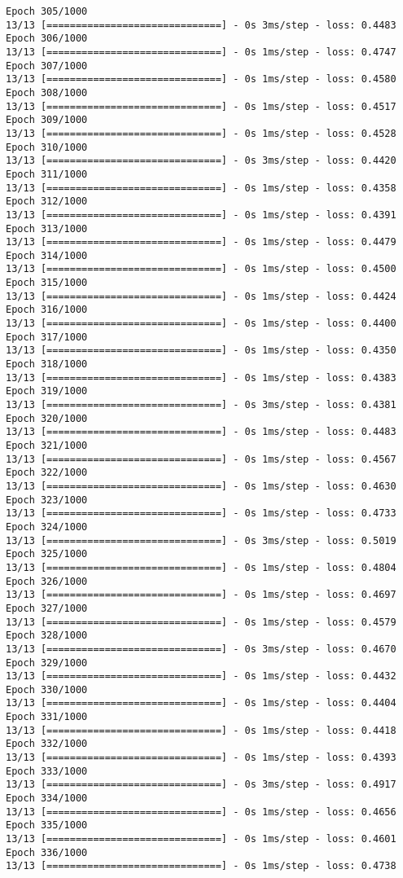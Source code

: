 \documentclass[11pt]{article}
\begin{document}
\begin{Verbatim}[commandchars=\\\{\}]
Epoch 305/1000
13/13 [==============================] - 0s 3ms/step - loss: 0.4483
Epoch 306/1000
13/13 [==============================] - 0s 1ms/step - loss: 0.4747
Epoch 307/1000
13/13 [==============================] - 0s 1ms/step - loss: 0.4580
Epoch 308/1000
13/13 [==============================] - 0s 1ms/step - loss: 0.4517
Epoch 309/1000
13/13 [==============================] - 0s 1ms/step - loss: 0.4528
Epoch 310/1000
13/13 [==============================] - 0s 3ms/step - loss: 0.4420
Epoch 311/1000
13/13 [==============================] - 0s 1ms/step - loss: 0.4358
Epoch 312/1000
13/13 [==============================] - 0s 1ms/step - loss: 0.4391
Epoch 313/1000
13/13 [==============================] - 0s 1ms/step - loss: 0.4479
Epoch 314/1000
13/13 [==============================] - 0s 1ms/step - loss: 0.4500
Epoch 315/1000
13/13 [==============================] - 0s 1ms/step - loss: 0.4424
Epoch 316/1000
13/13 [==============================] - 0s 1ms/step - loss: 0.4400
Epoch 317/1000
13/13 [==============================] - 0s 1ms/step - loss: 0.4350
Epoch 318/1000
13/13 [==============================] - 0s 1ms/step - loss: 0.4383
Epoch 319/1000
13/13 [==============================] - 0s 3ms/step - loss: 0.4381
Epoch 320/1000
13/13 [==============================] - 0s 1ms/step - loss: 0.4483
Epoch 321/1000
13/13 [==============================] - 0s 1ms/step - loss: 0.4567
Epoch 322/1000
13/13 [==============================] - 0s 1ms/step - loss: 0.4630
Epoch 323/1000
13/13 [==============================] - 0s 1ms/step - loss: 0.4733
Epoch 324/1000
13/13 [==============================] - 0s 3ms/step - loss: 0.5019
Epoch 325/1000
13/13 [==============================] - 0s 1ms/step - loss: 0.4804
Epoch 326/1000
13/13 [==============================] - 0s 1ms/step - loss: 0.4697
Epoch 327/1000
13/13 [==============================] - 0s 1ms/step - loss: 0.4579
Epoch 328/1000
13/13 [==============================] - 0s 3ms/step - loss: 0.4670
Epoch 329/1000
13/13 [==============================] - 0s 1ms/step - loss: 0.4432
Epoch 330/1000
13/13 [==============================] - 0s 1ms/step - loss: 0.4404
Epoch 331/1000
13/13 [==============================] - 0s 1ms/step - loss: 0.4418
Epoch 332/1000
13/13 [==============================] - 0s 1ms/step - loss: 0.4393
Epoch 333/1000
13/13 [==============================] - 0s 3ms/step - loss: 0.4917
Epoch 334/1000
13/13 [==============================] - 0s 1ms/step - loss: 0.4656
Epoch 335/1000
13/13 [==============================] - 0s 1ms/step - loss: 0.4601
Epoch 336/1000
13/13 [==============================] - 0s 1ms/step - loss: 0.4738

\end{Verbatim}
\end{document}
